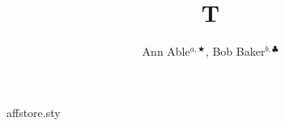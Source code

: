 \begin{filecontents*}[overwrite]{affstore.sty}
\newcommand{\affiliation}[1]{\def\@affiliation{#1}}
\affiliation{}
\def\maketitle{\begin{center}{\Large\@title}\par\bigskip\@author\par\bigskip{\emph\@affiliation}\end{center}}
\end{filecontents*}
\documentclass{article}
\usepackage{amssymb}
\usepackage{affstore}
\title{T}
\author{Ann Able$^{a,\bigstar}$, Bob Baker$^{b,\clubsuit}$}

\maketitle
Text.

